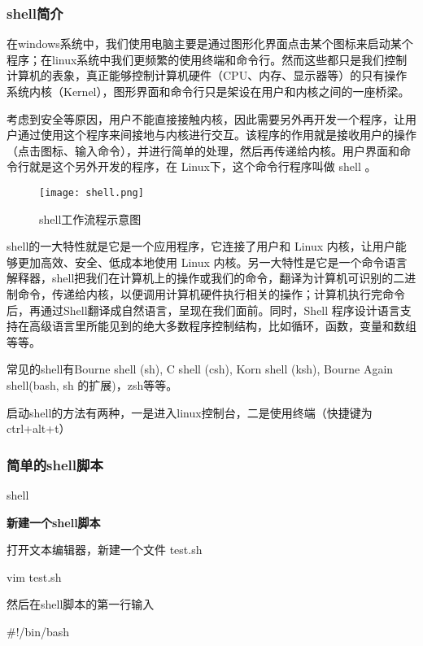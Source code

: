 \subsubsection{shell简介}

在windows系统中，我们使用电脑主要是通过图形化界面点击某个图标来启动某个程序；在linux系统中我们更频繁的使用终端和命令行。然而这些都只是我们控制计算机的表象，真正能够控制计算机硬件（CPU、内存、显示器等）的只有操作系统内核（Kernel），图形界面和命令行只是架设在用户和内核之间的一座桥梁。

考虑到安全等原因，用户不能直接接触内核，因此需要另外再开发一个程序，让用户通过使用这个程序来间接地与内核进行交互。该程序的作用就是接收用户的操作（点击图标、输入命令），并进行简单的处理，然后再传递给内核。用户界面和命令行就是这个另外开发的程序，在 Linux下，这个命令行程序叫做 shell 。

\begin{figure}[H]
    \centering
    \texttt{[image: shell.png]}
    \caption{shell工作流程示意图} %
    \label{fig:shell} %
\end{figure}

shell的一大特性就是它是一个应用程序，它连接了用户和 Linux 内核，让用户能够更加高效、安全、低成本地使用 Linux 内核。另一大特性是它是一个命令语言解释器，shell把我们在计算机上的操作或我们的命令，翻译为计算机可识别的二进制命令，传递给内核，以便调用计算机硬件执行相关的操作；计算机执行完命令后，再通过Shell翻译成自然语言，呈现在我们面前。同时，Shell 程序设计语言支持在高级语言里所能见到的绝大多数程序控制结构，比如循环，函数，变量和数组等等。

常见的shell有Bourne shell (sh), C shell (csh), Korn shell (ksh), Bourne Again shell(bash, sh 的扩展)，zsh等等。

启动shell的方法有两种，一是进入linux控制台，二是使用终端（快捷键为ctrl+alt+t）

\subsubsection{简单的shell脚本}

shell

\textbf{新建一个shell脚本}

打开文本编辑器，新建一个文件 test.sh

\begin{tcode}
	vim test.sh
\end{tcode}

然后在shell脚本的第一行输入

\begin{tcode}
	#!/bin/bash
\end{tcode}


